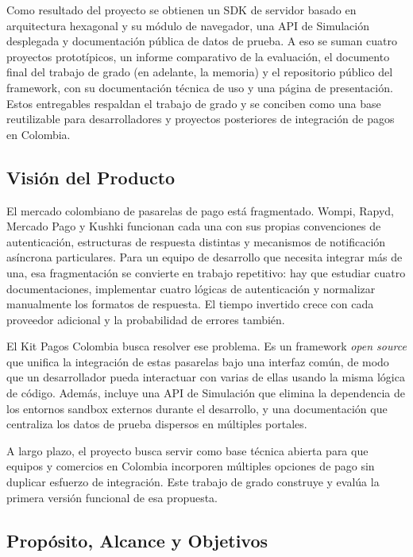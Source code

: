 Como resultado del proyecto se obtienen un SDK de servidor basado en arquitectura hexagonal y su módulo de navegador, una API de Simulación desplegada y documentación pública de datos de prueba. A eso se suman cuatro proyectos prototípicos, un informe comparativo de la evaluación, el documento final del trabajo de grado (en adelante, la memoria) y el repositorio público del framework, con su documentación técnica de uso y una página de presentación. Estos entregables respaldan el trabajo de grado y se conciben como una base reutilizable para desarrolladores y proyectos posteriores de integración de pagos en Colombia.

\subsection{Visión del Producto}

El mercado colombiano de pasarelas de pago está fragmentado. Wompi, Rapyd, Mercado Pago y Kushki funcionan cada una con sus propias convenciones de autenticación, estructuras de respuesta distintas y mecanismos de notificación asíncrona particulares. Para un equipo de desarrollo que necesita integrar más de una, esa fragmentación se convierte en trabajo repetitivo: hay que estudiar cuatro documentaciones, implementar cuatro lógicas de autenticación y normalizar manualmente los formatos de respuesta. El tiempo invertido crece con cada proveedor adicional y la probabilidad de errores también.

El Kit Pagos Colombia busca resolver ese problema. Es un framework \textit{open source} que unifica la integración de estas pasarelas bajo una interfaz común, de modo que un desarrollador pueda interactuar con varias de ellas usando la misma lógica de código. Además, incluye una API de Simulación que elimina la dependencia de los entornos sandbox externos durante el desarrollo, y una documentación que centraliza los datos de prueba dispersos en múltiples portales.

A largo plazo, el proyecto busca servir como base técnica abierta para que equipos y comercios en Colombia incorporen múltiples opciones de pago sin duplicar esfuerzo de integración. Este trabajo de grado construye y evalúa la primera versión funcional de esa propuesta.

\subsection{Propósito, Alcance y Objetivos}

